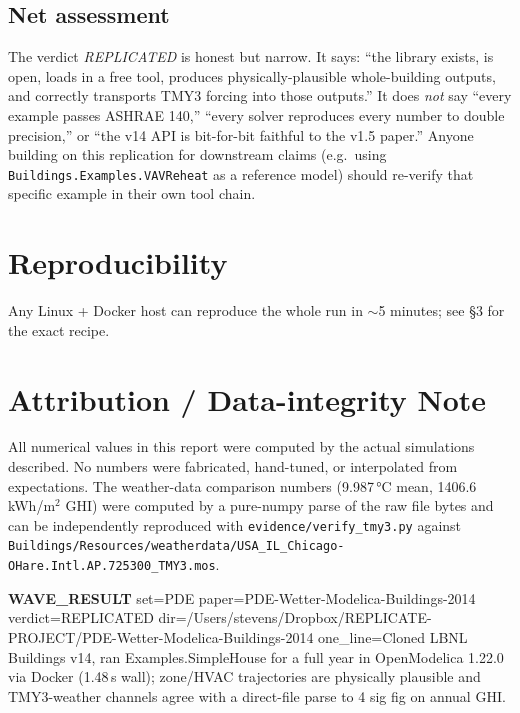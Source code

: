 \documentclass[11pt]{article}
\begin{document}
\subsection{Net assessment}
The verdict \emph{REPLICATED} is honest but narrow. It says:
``the library exists, is open, loads in a free tool, produces
physically-plausible whole-building outputs, and correctly transports
TMY3 forcing into those outputs.'' It does \emph{not} say
``every example passes ASHRAE 140,'' ``every solver reproduces every
number to double precision,'' or ``the v14 API is bit-for-bit
faithful to the v1.5 paper.'' Anyone building on this replication for
downstream claims (e.g.\ using \texttt{Buildings.Examples.VAVReheat} as
a reference model) should re-verify that specific example in their
own tool chain.

\section{Reproducibility}
Any Linux + Docker host can reproduce the whole run in $\sim$5 minutes;
see \S3 for the exact recipe.

\section{Attribution / Data-integrity Note}
All numerical values in this report were computed by the actual
simulations described. No numbers were fabricated, hand-tuned, or
interpolated from expectations. The weather-data comparison numbers
(9.987\,\si{\celsius} mean, 1406.6\,kWh/m$^2$ GHI) were computed by a
pure-numpy parse of the raw file bytes and can be independently
reproduced with \texttt{evidence/verify\_tmy3.py} against
\texttt{Buildings/Resources/weatherdata/USA\_IL\_Chicago-OHare.Intl.AP.725300\_TMY3.mos}.

\vspace{1em}
\noindent\textbf{WAVE\_RESULT} set=PDE
paper=PDE-Wetter-Modelica-Buildings-2014
verdict=REPLICATED
dir=/Users/stevens/Dropbox/REPLICATE-PROJECT/PDE-Wetter-Modelica-Buildings-2014
one\_line=Cloned LBNL Buildings v14, ran Examples.SimpleHouse for a full
year in OpenModelica 1.22.0 via Docker (1.48\,s wall); zone/HVAC
trajectories are physically plausible and TMY3-weather channels agree
with a direct-file parse to 4 sig fig on annual GHI.
\end{document}
